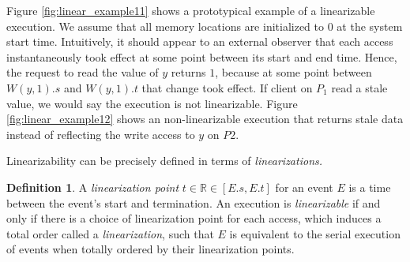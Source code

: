 \documentclass[]             %
{NASA}                       %
\theoremstyle{definition}
\newtheorem{definition}{Definition}[section]
\begin{document}
Figure \ref{fig:linear_example11} shows a prototypical example of a
linearizable execution. We assume that all memory locations are
initialized to \(0\) at the system start time. Intuitively, it should
appear to an external observer that each access instantaneously took
effect at some point between its start and end time. Hence, the request
to read the value of \(y\) returns \(1\), because at some point between
\(W(y,1).s\) and \(W(y,1).t\) that change took effect. If client on
\(P_1\) read a stale value, we would say the execution is not
linearizable. Figure \ref{fig:linear_example12} shows an
non-linearizable execution that returns stale data instead of reflecting
the write access to \(y\) on \(P2\).

Linearizability can be precisely defined in terms of
\emph{linearizations.}

\begin{definition}
A \emph{linearization point} $t \in \mathbb{R} \in [E.s, E.t]$ for an
event $E$ is a time between the event's start and termination. An
execution is \emph{linearizable} if and only if there is a choice of
linearization point for each access, which induces a total order called a \emph{linearization},
such that $E$ is equivalent to
the serial execution of events when totally ordered by their
linearization points.
\end{definition}
\end{document}
